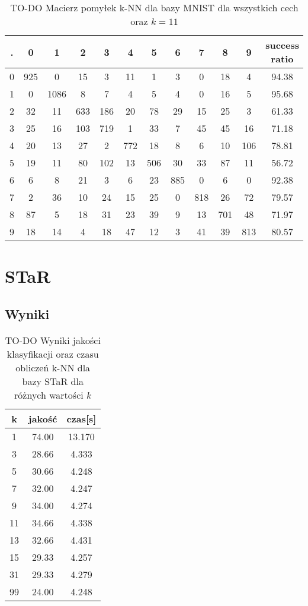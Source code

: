 \documentclass{classrepshort}
\begin{document}
\begin{table}[h!]
  \centering
  \caption{TO-DO Macierz pomyłek k-NN dla bazy MNIST dla wszystkich cech oraz $k=11$}
  \label{tab:tab1}
  \begin{tabular}{|c|c|c|c|c|c|c|c|c|c|c|c|}
    \hline
	. & 0 & 1 & 2 & 3 & 4 & 5 & 6 & 7 & 8 & 9 & success ratio \\
    \hline
	0 & 925 & 0 & 15 & 3 & 11 & 1 & 3 & 0 & 18 & 4 & 94.38\\
    \hline
	1 & 0 & 1086 & 8 & 7 & 4 & 5 & 4 & 0 & 16 & 5 & 95.68\\
	\hline
	2 & 32 & 11 & 633 & 186 & 20 & 78 & 29 & 15 & 25 & 3 & 61.33\\
	\hline
	3 & 25 & 16 & 103 & 719 & 1 & 33 & 7 & 45 & 45 & 16 & 71.18\\
	\hline
	4 & 20 & 13 & 27 & 2 & 772 & 18 & 8 & 6 & 10 & 106 & 78.81\\
	\hline
	5 & 19 & 11 & 80 & 102 & 13 & 506 & 30 & 33 & 87 & 11 & 56.72\\
	\hline
	6 & 6 & 8 & 21 & 3 & 6 & 23 & 885 & 0 & 6 & 0 & 92.38\\
	\hline
	7 & 2 & 36 & 10 & 24 & 15 & 25 & 0 & 818 & 26 & 72 & 79.57\\
	\hline
	8 & 87 & 5 & 18 & 31 & 23 & 39 & 9 & 13 & 701 & 48 & 71.97\\
	\hline
	9 & 18 & 14 & 4 & 18 & 47 & 12 & 3 & 41 & 39 & 813 & 80.57\\    
    \hline
  \end{tabular}
\end{table}

\newpage

\section{STaR}

\subsection{Wyniki}

\begin{table}[h!]
  \centering
  \caption{TO-DO Wyniki jakości klasyfikacji oraz czasu obliczeń k-NN dla bazy STaR dla różnych wartości $k$}
  \label{tab:tab1}
  \begin{tabular}{|c|c|c|}
    \hline
	k & jakość & czas[s]\\
    \hline
	1 & 74.00 & 13.170\\
    \hline
	3 & 28.66 & 4.333\\
	\hline
	5 & 30.66 & 4.248\\
	\hline
	7 & 32.00 & 4.247\\
	\hline
	9 & 34.00 & 4.274\\
	\hline
	11 & 34.66 & 4.338\\
	\hline
	13 & 32.66 & 4.431\\
	\hline
	15 & 29.33 & 4.257\\
	\hline
	31 & 29.33 & 4.279\\
	\hline
	99 & 24.00 & 4.248\\
	\hline
  \end{tabular}
\end{table}
\end{document}
